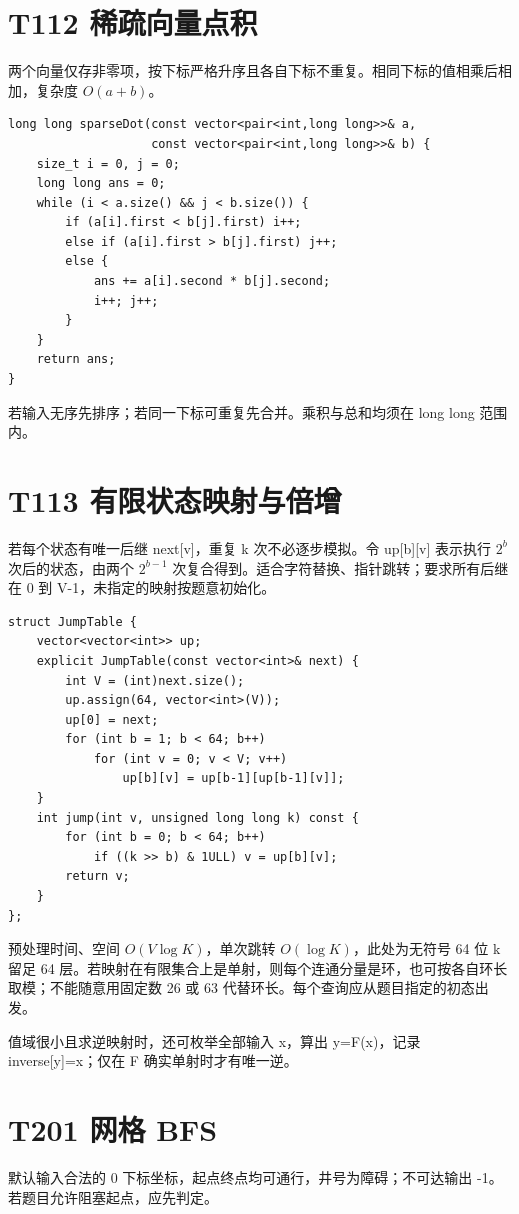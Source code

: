 \section{T112 稀疏向量点积}\label{sec:09-14}\label{tpl:112}
两个向量仅存非零项，按下标严格升序且各自下标不重复。相同下标的值相乘后相加，复杂度 $O(a+b)$。
\begin{lstlisting}
long long sparseDot(const vector<pair<int,long long>>& a,
                    const vector<pair<int,long long>>& b) {
    size_t i = 0, j = 0;
    long long ans = 0;
    while (i < a.size() && j < b.size()) {
        if (a[i].first < b[j].first) i++;
        else if (a[i].first > b[j].first) j++;
        else {
            ans += a[i].second * b[j].second;
            i++; j++;
        }
    }
    return ans;
}
\end{lstlisting}
若输入无序先排序；若同一下标可重复先合并。乘积与总和均须在 long long 范围内。


\section{T113 有限状态映射与倍增}\label{tpl:113}
若每个状态有唯一后继 next[v]，重复 k 次不必逐步模拟。令 up[b][v] 表示执行 $2^b$ 次后的状态，由两个 $2^{b-1}$ 次复合得到。适合字符替换、指针跳转；要求所有后继在 0 到 V-1，未指定的映射按题意初始化。
\begin{lstlisting}
struct JumpTable {
    vector<vector<int>> up;
    explicit JumpTable(const vector<int>& next) {
        int V = (int)next.size();
        up.assign(64, vector<int>(V));
        up[0] = next;
        for (int b = 1; b < 64; b++)
            for (int v = 0; v < V; v++)
                up[b][v] = up[b-1][up[b-1][v]];
    }
    int jump(int v, unsigned long long k) const {
        for (int b = 0; b < 64; b++)
            if ((k >> b) & 1ULL) v = up[b][v];
        return v;
    }
};
\end{lstlisting}
预处理时间、空间 $O(V\log K)$，单次跳转 $O(\log K)$，此处为无符号 64 位 k 留足 64 层。若映射在有限集合上是单射，则每个连通分量是环，也可按各自环长取模；不能随意用固定数 26 或 63 代替环长。每个查询应从题目指定的初态出发。

值域很小且求逆映射时，还可枚举全部输入 x，算出 y=F(x)，记录 inverse[y]=x；仅在 F 确实单射时才有唯一逆。
\section{T201 网格 BFS}\label{sec:09-15}\label{tpl:201}

默认输入合法的 0 下标坐标，起点终点均可通行，井号为障碍；不可达输出 -1。若题目允许阻塞起点，应先判定。

